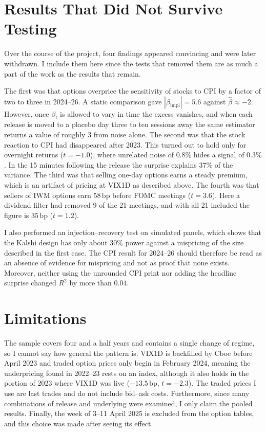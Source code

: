 \documentclass[10pt]{article}
\newcommand{\bp}{\,\mathrm{bp}}
\begin{document}
\section{Results That Did Not Survive Testing}
Over the course of the project, four findings appeared convincing and were later withdrawn. I include them here since the tests that removed them are as much a part of the work as the results that remain.

The first was that options overprice the sensitivity of stocks to CPI by a factor of two to three in 2024--26. A static comparison gave $|\beta_{\mathrm{impl}}|=5.6$ against $\hat\beta\approx-2$. However, once $\beta_t$ is allowed to vary in time the excess vanishes, and when each release is moved to a placebo day three to ten sessions away the same estimator returns a value of roughly $3$ from noise alone. The second was that the stock reaction to CPI had disappeared after 2023. This turned out to hold only for overnight returns ($t=-1.0$), where unrelated noise of $0.8\%$ hides a signal of $0.3\%$. In the 15 minutes following the release the surprise explains $37\%$ of the variance. The third was that selling one-day options earns a steady premium, which is an artifact of pricing at VIX1D as described above. The fourth was that sellers of IWM options earn $58\bp$ before FOMC meetings ($t=3.6$). Here a dividend filter had removed 9 of the 21 meetings, and with all 21 included the figure is $35\bp$ ($t=1.2$).

I also performed an injection--recovery test on simulated panels, which shows that the Kalshi design has only about $30\%$ power against a mispricing of the size described in the first case. The CPI result for 2024--26 should therefore be read as an absence of evidence for mispricing and not as proof that none exists. Moreover, neither using the unrounded CPI print nor adding the headline surprise changed $R^2$ by more than $0.04$.

\section{Limitations}
The sample covers four and a half years and contains a single change of regime, so I cannot say how general the pattern is. VIX1D is backfilled by Cboe before April 2023 and traded option prices only begin in February 2024, meaning the underpricing found in 2022--23 rests on an index, although it also holds in the portion of 2023 where VIX1D was live ($-13.5\bp$, $t=-2.3$). The traded prices I use are last trades and do not include bid--ask costs. Furthermore, since many combinations of release and underlying were examined, I only claim the pooled results. Finally, the week of 3--11 April 2025 is excluded from the option tables, and this choice was made after seeing its effect.
\end{document}
